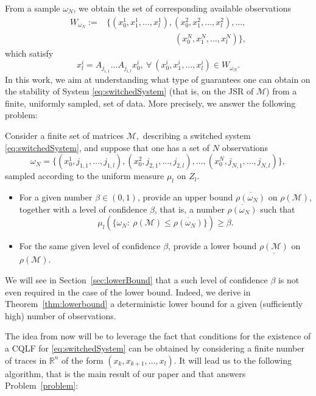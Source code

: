 From a sample $\omega_N$, we obtain the set of corresponding available observations 
\begin{equation}
\begin{aligned}
W_{\omega_N} := & \{(x_0^1,x_1^1, \dots, x_l^1), (x_0^2,x_1^2, \dots, x_l^2), \ldots,\\ 
& \qquad \qquad \qquad \qquad(x_0^N,x_1^N, \dots, x_l^N)\},
\end{aligned}
\end{equation}
which satisfy $$x_l^i= A_{j_{i,1}} \dots A_{j_{i,l}} x_0^i, \ \forall\ (x_0^i,x_1^i,\dots, x_l^i) \in W_{\omega_N}.$$
In this work, we aim at understanding what type of guarantees one can obtain on the stability of System \eqref{eq:switchedSystem} (that is, on the JSR of $\mathcal{M}$) from a finite, uniformly sampled, set of data. More precisely, we answer the following problem:
\begin{prob}\label{problem} 
Consider a finite set of matrices $\mathcal{M},$ describing a switched system \eqref{eq:switchedSystem}, and suppose that one has a set of $N$ observations $$\omega_N=\{(x_0^1, j_{1,1}, \dots, j_{1,l}), (x_0^2, j_{2,1}, \dots, j_{2,l}), \ldots, (x_0^N, j_{N,1},\dots, j_{N,l})\},$$ sampled according to the uniform measure $\mu_l$ on $Z_l$.
\begin{itemize}
\item For a given number $\beta \in (0,1)$, provide an upper bound $\overline{\rho(\omega_N)}$ on $\rho(\mathcal{M})$, together with a level of confidence $\beta$, that is, a number $\overline{\rho(\omega_N)}$ such that $$\mu_l \left( \{\omega_N: \ \rho(\mathcal{M}) \leq \overline{\rho(\omega_N)} \} \right) \geq \beta.$$
\item For the same given level of confidence $\beta$, provide a lower bound $\underline{\rho(\mathcal{M})}$ on $\rho(\mathcal{M})$.
\end{itemize}
\end{prob}
\begin{rem}
We will see in Section~\ref{sec:lowerBound} that a such level of confidence $\beta$ is not even required in the case of the lower bound. Indeed, we derive in Theorem~\ref{thm:lowerbound} a deterministic lower bound for a given (sufficiently high) number of observations. 
\end{rem}
The idea from now will be to leverage the fact that conditions for the existence of a CQLF for \eqref{eq:switchedSystem} can be obtained by considering a finite number of traces in $\mathbb{R}^n$ of the form $(x_k,x_{k+1}, \dots, x_{l})$. It will lead us to the following algorithm, that is the main result of our paper and that answers Problem~\ref{problem}:
